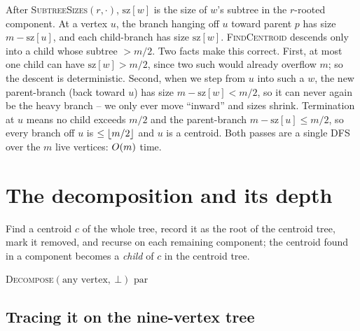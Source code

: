\begin{whybox}
After \textsc{SubtreeSizes}$(r,\cdot)$, $\mathrm{sz}[w]$ is the size of $w$'s
subtree in the $r$-rooted component. At a vertex $u$, the branch hanging off $u$
toward parent $p$ has size $m-\mathrm{sz}[u]$, and each child-branch has size
$\mathrm{sz}[w]$. \textsc{FindCentroid} descends only into a child whose subtree
$>m/2$. Two facts make this correct. First, at most one child can have
$\mathrm{sz}[w]>m/2$, since two such would already overflow $m$; so the descent is
deterministic. Second, when we step from $u$ into such a $w$, the new
parent-branch (back toward $u$) has size $m-\mathrm{sz}[w]<m/2$, so it can never
again be the heavy branch -- we only ever move ``inward'' and sizes shrink.
Termination at $u$ means no child exceeds $m/2$ and the parent-branch
$m-\mathrm{sz}[u]\le m/2$, so every branch off $u$ is $\le\lfloor m/2\rfloor$ and $u$ is a
centroid. Both passes are a single DFS over the $m$ live vertices: $O(m)$ time.
\end{whybox}

\section{The decomposition and its depth}
\label{ch20:decomp}

Find a centroid $c$ of the whole tree, record it as the root of the
centroid tree, mark it removed, and recurse on each remaining component; the
centroid found in a component becomes a \emph{child} of $c$ in the centroid tree.

\begin{algorithm}[H]
\caption{Build the centroid decomposition}
\label{ch20:alg-build}
\DontPrintSemicolon
{}
\textsc{Decompose}$(\text{any vertex},\ \bot)$\;
\Return $\mathrm{par}$\;
\end{algorithm}

\subsection{Tracing it on the nine-vertex tree}

